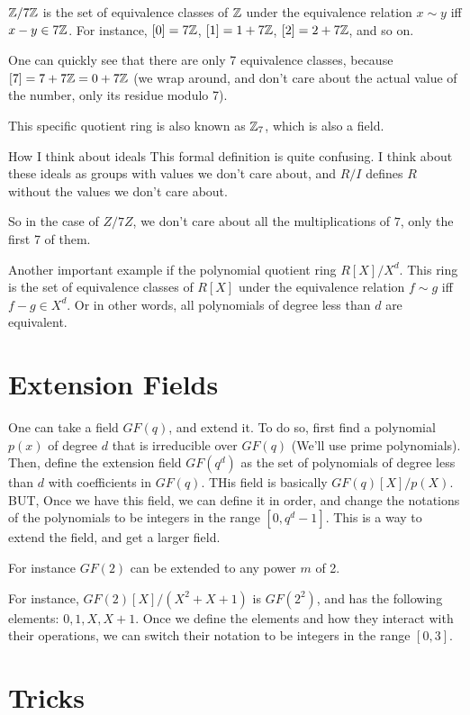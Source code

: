 \begin{example}
    $\mathbb{Z}/7\mathbb{Z}$ is the set of equivalence classes of $\mathbb{Z}$ under the equivalence relation
    $x\sim y$ iff $x-y\in 7\mathbb{Z}$. 
    For instance, $[0]=7\mathbb{Z}$, $[1]=1+7\mathbb{Z}$, $[2]=2+7\mathbb{Z}$, and so on.

    One can quickly see that there are only 7 equivalence classes, because $[7]=7+7\mathbb{Z}=0+7\mathbb{Z}$ (we wrap around, 
    and don't care about the actual value of the number, only its residue modulo 7).

    This specific quotient ring is also known as $\mathbb{Z}_7$, which is also a field.
\end{example}


\begin{bclogo}[logo=\bcinfo, couleurBarre=orange, noborder=true, couleur=white]{How I think about ideals}
    This formal definition is quite confusing. I think about these ideals as groups 
    with values we don't care about, and $R/I$ defines $R$ without 
    the values we don't care about.

    So in the case of $Z/7Z$, we don't care about 
    all the multiplications of $7$, only the first 7 of them.
\end{bclogo}


Another important example if the polynomial quotient ring $R[X]/X^d$. 
This ring is the set of equivalence classes of $R[X]$ under the equivalence relation
$f\sim g$ iff $f-g\in X^d$. Or in other words, all polynomials of degree less than $d$ are equivalent.


\section{Extension Fields}

One can take a field $GF(q)$, and extend it.
To do so, first find a polynomial $p(x)$ of degree $d$ that is irreducible over $GF(q)$
(We'll use prime polynomials).
Then, define the extension field $GF(q^d)$ as the set of polynomials of degree less than $d$ with coefficients in $GF(q)$.
THis field is basically $GF(q)[X]/p(X)$. BUT, Once we have this field, 
we can define it in order, and change the notations of the polynomials to be integers 
in the range $[0,q^d-1]$. This is a way to extend the field, and get a larger field.


For instance $GF(2)$ can be extended to any power $m$ of 2.

For instance, $GF(2)[X]/(X^2+X+1)$ is $GF(2^2)$, and has the following elements:
$0,1,X,X+1$. Once we define the elements and how they interact with their operations, we can 
switch their notation to be integers in the range $[0,3]$. 


\section{Tricks}
